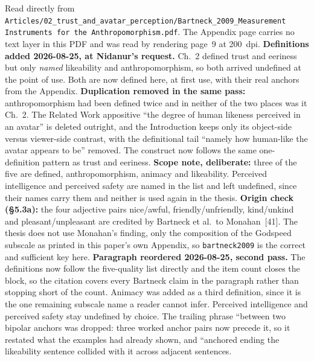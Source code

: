 \documentclass[11pt, a4paper]{article}
\begin{document}
\begin{Form}
  {Read directly from \texttt{\footnotesize Articles/02\_trust\_and\_avatar\_perception/Bartneck\_2009\_Measurement Instruments for the Anthropomorphism.pdf}. The Appendix page carries no text layer in this PDF and was read by rendering page~9 at 200~dpi. \textbf{Definitions added 2026-08-25, at Nidanur's request.} Ch.~2 defined trust and eeriness but only \emph{named} likeability and anthropomorphism, so both arrived undefined at the point of use. Both are now defined here, at first use, with their real anchors from the Appendix. \textbf{Duplication removed in the same pass:} anthropomorphism had been defined twice and in neither of the two places was it Ch.~2. The Related Work appositive ``the degree of human likeness perceived in an avatar'' is deleted outright, and the Introduction keeps only its object-side versus viewer-side contrast, with the definitional tail ``namely how human-like the avatar appears to be'' removed. The construct now follows the same one-definition pattern as trust and eeriness. \textbf{Scope note, deliberate:} three of the five are defined, anthropomorphism, animacy and likeability. Perceived intelligence and perceived safety are named in the list and left undefined, since their names carry them and neither is used again in the thesis. \textbf{Origin check (\S5.3a):} the four adjective pairs nice/awful, friendly/unfriendly, kind/unkind and pleasant/unpleasant are credited by Bartneck et al.\ to Monahan~[41]. The thesis does not use Monahan's finding, only the composition of the Godspeed subscale as printed in this paper's own Appendix, so \texttt{bartneck2009} is the correct and sufficient key here. \textbf{Paragraph reordered 2026-08-25, second pass.} The definitions now follow the five-quality list directly and the item count closes the block, so the citation covers every Bartneck claim in the paragraph rather than stopping short of the count. Animacy was added as a third definition, since it is the one remaining subscale name a reader cannot infer. Perceived intelligence and perceived safety stay undefined by choice. The trailing phrase ``between two bipolar anchors was dropped: three worked anchor pairs now precede it, so it restated what the examples had already shown, and ``anchored ending the likeability sentence collided with it across adjacent sentences.}


\end{Form}
\end{document}
